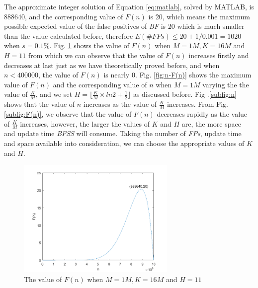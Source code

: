 \documentclass[conference]{IEEEtran}
\begin{document}
The approximate integer solution of Equation \ref{eq:matlab}, solved by MATLAB, is 888640, and the corresponding value of $F(n)$ is 20, which means the maximum possible expected value of the false positives of \emph{BF} is 20 which is much smaller than the value calculated before, therefore $E(\#FPs)\leq 20+1/0.001=1020$ when $s=0.1\%$. Fig. \ref{fig:F(n)-16000000} shows the value of $F(n)$ when $M=1M,K=16M$ and $H=11$ from which we can observe that the value of $F(n)$ increases firstly and decreases at last just as we have theoretically proved before, and when $n<400000$, the value of $F(n)$ is nearly 0. Fig. \ref{fig:n-F(n)} shows the maximum value of $F(n)$ and the corresponding value of $n$ when $M=1M$ varying the the value of $\frac{K}{M}$, and we set $H=\lfloor \frac{K}{M}\times ln2+\frac{1}{2}\rfloor$ as discussed before. Fig .\ref{subfig:n} shows that the value of $n$ increases as the value of $\frac{K}{M}$ increases. From Fig. \ref{subfig:F(n)}, we observe that the value of $F(n)$ decreases rapidly as the value of $\frac{K}{M}$ increases, however, the larger the values of $K$ and $H$ are, the more space and update time \emph{BFSS} will consume. Taking the number of \emph{FPs}, update time and space available into consideration, we can choose the appropriate values of $K$ and $H$.

\begin{figure}
	\centering
	\includegraphics[width=3in]{png/F(n)-16000000.png}
	\caption{The value of $F(n)$ when $M=1M,K=16M$ and $H=11$}
	\label{fig:F(n)-16000000}
\end{figure}
\end{document}
